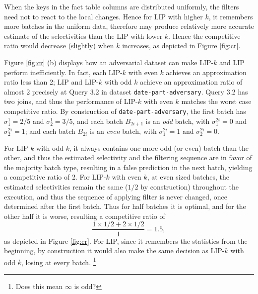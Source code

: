 When the keys in the fact table columns are distributed uniformly, the filters need not to react to the local changes. Hence for LIP with higher $k$, it remembers more batches in the uniform data, therefore may produce relatively more accurate estimate of the selectivities than the LIP with lower $k$. Hence the competitive ratio would decrease (slightly) when $k$ increases, as depicted in Figure \ref{fig:cr}.  


Figure \ref{fig:cr} (b) displays how an adversarial dataset can make LIP-$k$ and LIP perform inefficiently. In fact, each LIP-$k$ with even $k$ achieves an approximation ratio less than 2; LIP and LIP-$k$ with odd $k$ achieve an approximation ratio of almost 2 precisely at Query 3.2 in dataset \texttt{date-part-adversary}. Query 3.2 has two joins, and thus the performance of LIP-$k$ with even $k$ matches the worst case competitive ratio. By construction of \texttt{date-part-adversary}, the first batch has $\sigma^{1}_{1} = 2/5$ and $\sigma^{1}_{2} = 3/5$, and  each batch $B_{2i+1}$ is an \textit{odd} batch, with $\sigma^{2i}_{1} = 0$ and $\sigma^{2i}_{2} = 1$; and each batch $B_{2i}$ is an \textit{even} batch, with $\sigma^{2i}_{1} = 1$ and $\sigma^{2i}_{2} = 0$. 

For LIP-$k$ with odd $k$, it always contains one more odd (or even) batch than the other, and thus the estimated selectivity and the filtering sequence are in favor of the majority batch type, resulting in a false prediction in the next batch, yielding a competitive ratio of 2. For LIP-$k$ with even $k$, at even sized batches, the estimated selectivities remain the same ($1/2$ by construction) throughout the execution, and thus the sequence of applying filter is never changed, once determined after the first batch. Thus for half batches it is optimal, and for the other half it is worse, resulting a competitive ratio of \[ \frac{1 \times 1/2 + 2 \times 1/2}{1} = 1.5,\] as depicted in Figure \ref{fig:cr}. For LIP, since it remembers the statistics from the beginning, by construction it would also make the same decision as LIP-$k$ with odd $k$, losing at every batch. \footnote{Does this mean $\infty$ is odd?}







